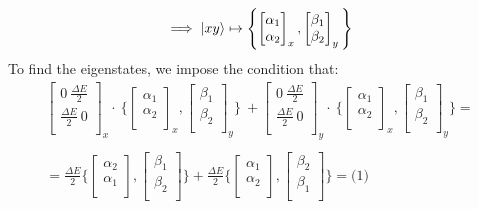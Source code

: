 \documentclass{article}
\begin{document}
$$\implies \ket{xy} \mapsto \Biggl\{ \begin{bmatrix}
    \alpha_1 \\
    \alpha_2 \\
\end{bmatrix}_x, \begin{bmatrix}
    \beta_1 \\
    \beta_2 \\
\end{bmatrix}_y \Biggl\}$$
To find the eigenstates, we impose the condition that: 
\begin{align*} 
\begin{bmatrix}
    0 \ \frac{\Delta E}{2} \\
    \frac{\Delta E}{2} \ 0 \\
\end{bmatrix}_x \cdot \ \Biggl\{ \begin{bmatrix}
    \alpha_1 \\
    \alpha_2 \\
\end{bmatrix}_x,\begin{bmatrix}
    \beta_1 \\
    \beta_2 \\
\end{bmatrix}_y \Biggl\} \ + \begin{bmatrix}
    0 \ \frac{\Delta E}{2} \\
    \frac{\Delta E}{2} \ 0 \\
\end{bmatrix}_y \cdot \ \Biggl\{ \begin{bmatrix}
    \alpha_1 \\
    \alpha_2 \\
\end{bmatrix}_x,\begin{bmatrix}
    \beta_1 \\
    \beta_2 \\
\end{bmatrix}_y \Biggl\} = \\ \\ = \frac{\Delta E}{2}  \Biggl\{ \begin{bmatrix}
    \alpha_2 \\
    \alpha_1 \\
\end{bmatrix},\begin{bmatrix}
    \beta_1 \\
    \beta_2 \\
\end{bmatrix} \Biggl\} + \frac{\Delta E}{2} \Biggl\{ \begin{bmatrix}
    \alpha_1 \\
    \alpha_2 \\
\end{bmatrix},\begin{bmatrix}
    \beta_2 \\
    \beta_1 \\
\end{bmatrix} \Biggl\} =  \bigl(1\bigl)
\end{align*}
\end{document}
